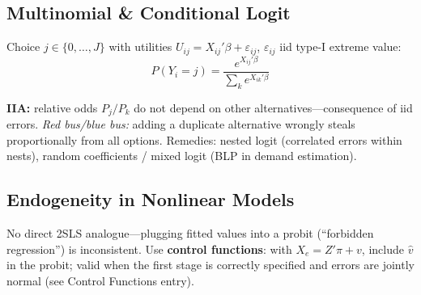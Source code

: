 \subsection{Multinomial \& Conditional Logit}
Choice $j \in \{0,\ldots,J\}$ with utilities $U_{ij} = X_{ij}'\beta + \varepsilon_{ij}$, $\varepsilon_{ij}$ iid type-I extreme value:
$$P(Y_i = j) = \frac{e^{X_{ij}'\beta}}{\sum_k e^{X_{ik}'\beta}}$$

\textbf{IIA:} relative odds $P_j/P_k$ do not depend on other alternatives---consequence of iid errors. \textit{Red bus/blue bus:} adding a duplicate alternative wrongly steals proportionally from all options. Remedies: nested logit (correlated errors within nests), random coefficients / mixed logit (BLP in demand estimation).

\subsection{Endogeneity in Nonlinear Models}
No direct 2SLS analogue---plugging fitted values into a probit (``forbidden regression'') is inconsistent. Use \textbf{control functions}: with $X_e = Z'\pi + v$, include $\hat v$ in the probit; valid when the first stage is correctly specified and errors are jointly normal (see Control Functions entry).

